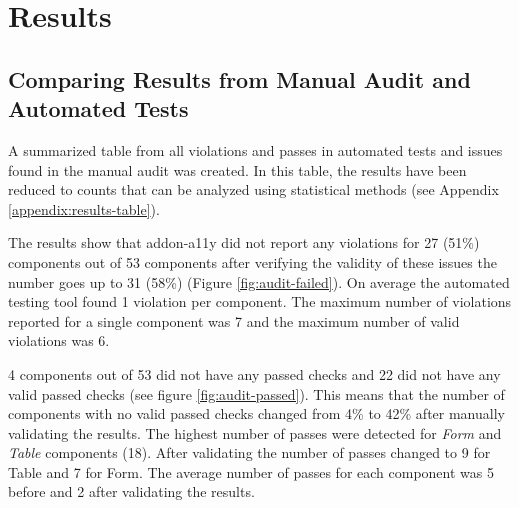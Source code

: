 \documentclass{master_thesis}
\begin{document}
\section{Results}

\subsection{Comparing Results from Manual Audit and Automated Tests}


A summarized table from all violations and passes in automated tests and issues found in the manual audit was created. In this table, the results have been reduced to counts that can be analyzed using statistical methods (see Appendix \ref{appendix:results-table}).

The results show that addon-a11y did not report any violations for 27 (51\%) components out of 53 components after verifying the validity of these issues the number goes up to 31 (58\%) (Figure \ref{fig:audit-failed}). On average the automated testing tool found 1 violation per component. The maximum number of violations reported for a single component was 7 and the maximum number of valid violations was 6.

4 components out of 53 did not have any passed checks and 22 did not have any valid passed checks (see figure \ref{fig:audit-passed}). This means that the number of components with no valid passed checks changed from 4\%  to 42\% after manually validating the results. The highest number of passes were detected for \textit{Form} and \textit{Table} components (18). After validating the number of passes changed to 9 for Table and 7 for Form. The average number of passes for each component was 5 before and 2 after validating the results.
\end{document}

